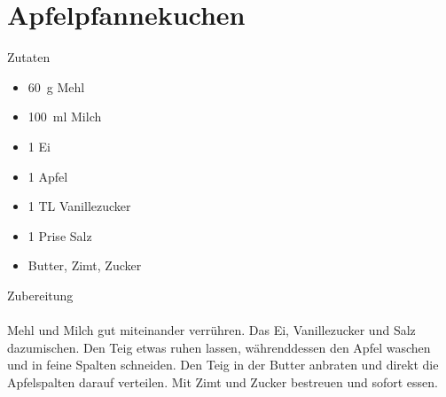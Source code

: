 \section*{Apfelpfannekuchen}
\ihead{}\ohead{}
\cfoot{}
{\Large Zutaten}
\begin{multicols}{2}
\begin{itemize}
    \item \SI{60}{g} Mehl
    \item \SI{100}{ml} Milch
    \item \num{1} Ei
    \item \num{1} Apfel
    \item \num{1} TL Vanillezucker
    \item \num{1} Prise Salz
    \item Butter, Zimt, Zucker
\end{itemize}
\end{multicols}
\noindent
{\Large Zubereitung}\\
\\
Mehl und Milch gut miteinander verrühren. 
Das Ei, Vanillezucker und Salz dazumischen.
Den Teig etwas ruhen lassen, währenddessen den Apfel waschen und in feine Spalten schneiden.
Den Teig in der Butter anbraten und direkt die Apfelspalten darauf verteilen.
Mit Zimt und Zucker bestreuen und sofort essen.